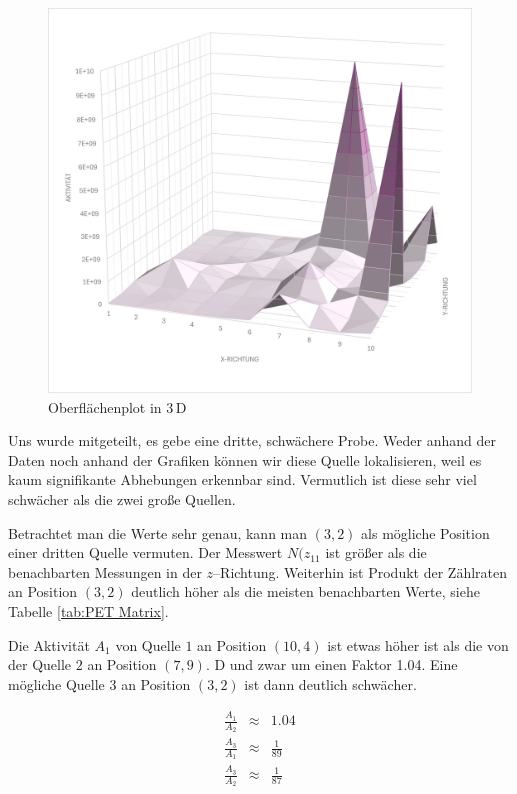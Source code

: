 \documentclass[12pt,a4paper]{scrartcl}
\numberwithin{equation}{section} %
\begin{document}
\begin{figure}[h!]
	\vspace{24pt}
	\begin{minipage}[t]{0.7\textwidth}
		\includegraphics[width=\textwidth]{../media/B3.4/PET_surface.jpg}
		\caption{Oberflächenplot in $3\,\mathrm D$}
		\label{abb:PET surface}
	\end{minipage}
\end{figure}

Uns wurde mitgeteilt, es gebe eine dritte, schwächere Probe. Weder anhand der Daten noch anhand der Grafiken können wir diese Quelle lokalisieren, weil es kaum signifikante Abhebungen erkennbar sind. Vermutlich ist diese sehr viel schwächer als die zwei große Quellen.

Betrachtet man die Werte sehr genau, kann man $(3,2)$ als mögliche Position einer dritten Quelle vermuten. Der Messwert $N(z_{11}$ ist größer als die benachbarten Messungen in der $z$--Richtung. Weiterhin ist Produkt der Zählraten an Position $(3,2)$ deutlich höher als die meisten benachbarten Werte, siehe Tabelle \ref{tab:PET Matrix}.

Die Aktivität $A_1$ von Quelle $1$ an Position $(10,4)$ ist etwas höher ist als die von der Quelle $2$ an Position $(7,9)$. D und zwar um einen Faktor 1.04. Eine mögliche Quelle $3$ an Position $(3,2)$ ist dann deutlich schwächer.

\begin{eqnarray}
	\frac{A_1}{A_2} &\approx& 1.04 \\
	\frac{A_3}{A_1} &\approx& \frac{1}{89} \\
	\frac{A_3}{A_2} &\approx& \frac{1}{87}
\end{eqnarray}
\end{document}
